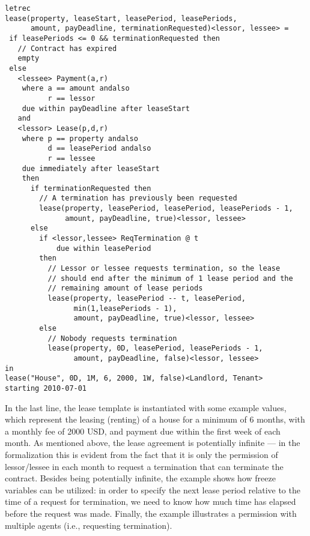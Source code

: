 \documentclass[orivec,final]{llncs-href}
\begin{document}
\begin{lstlisting}[language=csl]
letrec
lease(property, leaseStart, leasePeriod, leasePeriods,
      amount, payDeadline, terminationRequested)<lessor, lessee> =
 if leasePeriods <= 0 && terminationRequested then
   // Contract has expired
   empty
 else
   <lessee> Payment(a,r)
    where a == amount andalso
          r == lessor
    due within payDeadline after leaseStart
   and
   <lessor> Lease(p,d,r)
    where p == property andalso
          d == leasePeriod andalso
          r == lessee
    due immediately after leaseStart
    then
      if terminationRequested then
        // A termination has previously been requested
        lease(property, leasePeriod, leasePeriod, leasePeriods - 1,
              amount, payDeadline, true)<lessor, lessee>
      else
        if <lessor,lessee> ReqTermination @ t
            due within leasePeriod
        then
          // Lessor or lessee requests termination, so the lease
          // should end after the minimum of 1 lease period and the
          // remaining amount of lease periods
          lease(property, leasePeriod -- t, leasePeriod,
                min(1,leasePeriods - 1),
                amount, payDeadline, true)<lessor, lessee>
        else
          // Nobody requests termination
          lease(property, 0D, leasePeriod, leasePeriods - 1,
                amount, payDeadline, false)<lessor, lessee>
in
lease("House", 0D, 1M, 6, 2000, 1W, false)<Landlord, Tenant>
starting 2010-07-01
\end{lstlisting}
In the last line, the lease template is instantiated with some example
values, which represent the leasing (renting) of a house for a minimum
of 6 months, with a monthly fee of 2000 USD, and payment due within
the first week of each month. As mentioned above, the lease agreement
is potentially infinite --- in the formalization this is evident from
the fact that it is only the permission of lessor/lessee in each month to
request a termination that can terminate the contract. Besides being
potentially infinite, the example shows how freeze variables can be
utilized: in order to specify the next lease period relative to the
time of a request for termination, we need to know how much time has
elapsed before the request was made. Finally, the example
illustrates a permission with multiple agents (i.e., requesting
termination).
\end{document}
